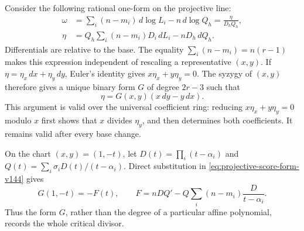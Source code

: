Consider the following rational one-form on the projective line:
\begin{equation}\label{eq:projective-score-form-v144}
 \begin{aligned}
 \omega&=\sum_i(n-m_i)\,d\log L_i-n\,d\log Q_h
       =\frac{\eta}{D_hQ_h},\\
 \eta&=Q_h\sum_i(n-m_i)D_i\,dL_i-nD_h\,dQ_h.
 \end{aligned}
\end{equation}
Differentials are relative to the base.  The equality
\(\sum_i(n-m_i)=n(r-1)\) makes this expression independent
of rescaling a representative \((x,y)\).  If
\(\eta=\eta_x\,dx+\eta_y\,dy\), Euler's identity gives
\(x\eta_x+y\eta_y=0\).  The syzygy of \((x,y)\) therefore
gives a unique binary form \(G\) of degree \(2r-3\) such that
\begin{equation}\label{eq:binary-score-v144}
                   \eta=G(x,y)(x\,dy-y\,dx).
\end{equation}
This argument is valid over the universal coefficient ring: reducing
\(x\eta_x+y\eta_y=0\) modulo \(x\) first shows that
\(x\) divides \(\eta_y\), and then determines both coefficients.
It remains valid after every base change.

On the chart \((x,y)=(1,-t)\), let
\(D(t)=\prod_i(t-\alpha_i)\) and
\(Q(t)=\sum_i\sigma_iD(t)/(t-\alpha_i)\).  Direct substitution
in \eqref{eq:projective-score-form-v144} gives
\begin{equation}\label{eq:projective-affine-score-v144}
 G(1,-t)=-F(t),\qquad
 F=nDQ'-Q\sum_i(n-m_i)\frac{D}{t-\alpha_i}.
\end{equation}
Thus the form \(G\), rather than the degree of a particular affine
polynomial, records the whole critical divisor.

